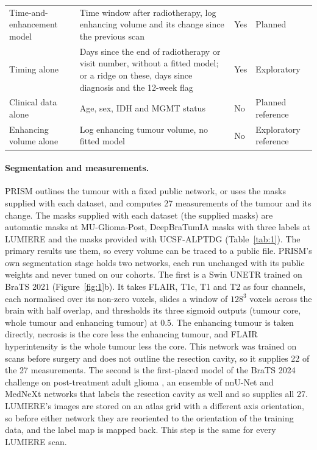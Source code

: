 \begin{table}[!htbp]
\begin{tabularx}{\linewidth}{@{}R{2.9cm}LR{1.3cm}R{3.4cm}@{}}
Time-and-enhancement model & Time window after radiotherapy, log enhancing volume and its change since the previous scan & Yes & Planned \\
Timing alone & Days since the end of radiotherapy or visit number, without a fitted model; or a ridge on these, days since diagnosis and the 12-week flag & Yes & Exploratory \\
Clinical data alone & Age, sex, IDH and MGMT status & No & Planned reference \\
Enhancing volume alone & Log enhancing tumour volume, no fitted model & No & Exploratory reference \\
\bottomrule
\end{tabularx}
\end{table}

\paragraph*{Segmentation and measurements.} PRISM outlines the tumour with a fixed public network, or uses the masks
supplied with each dataset, and computes 27 measurements of the tumour and its change. The masks supplied with each
dataset (the supplied masks) are automatic masks at MU-Glioma-Post, DeepBraTumIA masks with three labels at LUMIERE
and the masks provided with UCSF-ALPTDG (Table~\ref{tab:1}). The primary results use them, so every volume can be
traced to a public file. PRISM's own segmentation stage holds two networks, each run unchanged with its public weights
and never tuned on our cohorts. The first is a Swin UNETR trained on BraTS 2021 \citep{hatamizadeh2022}
(Figure~\ref{fig:1}b). It takes FLAIR, T1c, T1 and T2 as four channels, each normalised over its non-zero voxels,
slides a window of $128^3$ voxels across the brain with half overlap, and thresholds its three sigmoid outputs (tumour
core, whole tumour and enhancing tumour) at 0.5. The enhancing tumour is taken directly, necrosis is the core less the
enhancing tumour, and FLAIR hyperintensity is the whole tumour less the core. This network was trained on scans before
surgery and does not outline the resection cavity, so it supplies 22 of the 27 measurements. The second is the
first-placed model of the BraTS 2024 challenge on post-treatment adult glioma \citep{deverdier2024,ferreira2024}, an
ensemble of nnU-Net and MedNeXt networks that labels the resection cavity as well and so supplies all 27. LUMIERE's
images are stored on an atlas grid with a different axis orientation, so before either network they are reoriented to
the orientation of the training data, and the label map is mapped back. This step is the same for every LUMIERE scan.

